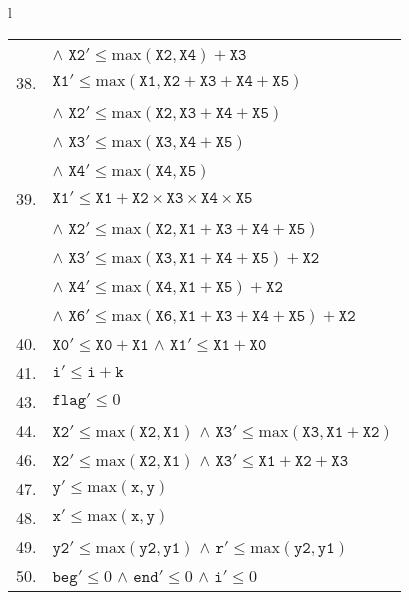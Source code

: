 \begin{table}[p]
{\begin{tabular}{l}
\begin{tabular}{p{.6cm}l}
     & $\land$ $\texttt{X2}' \leq \text{max}(\texttt{X2},\texttt{X4})+\texttt{X3}$ \\
 38. & $\texttt{X1}' \leq \text{max}(\texttt{X1},\texttt{X2}+\texttt{X3}+\texttt{X4}+\texttt{X5})$ \\
     & $\land$ $\texttt{X2}' \leq \text{max}(\texttt{X2},\texttt{X3}+\texttt{X4}+\texttt{X5})$ \\
     & $\land$ $\texttt{X3}' \leq \text{max}(\texttt{X3},\texttt{X4}+\texttt{X5})$ \\
     & $\land$ $\texttt{X4}' \leq \text{max}(\texttt{X4},\texttt{X5})$ \\
 39. & $\texttt{X1}' \leq \texttt{X1}+\texttt{X2}\times\texttt{X3}\times\texttt{X4}\times\texttt{X5}$ \\
     & $\land$ $\texttt{X2}' \leq \text{max}(\texttt{X2},\texttt{X1}+\texttt{X3}+\texttt{X4}+\texttt{X5})$ \\
     & $\land$ $\texttt{X3}' \leq \text{max}(\texttt{X3},\texttt{X1}+\texttt{X4}+\texttt{X5})+\texttt{X2}$ \\
     & $\land$ $\texttt{X4}' \leq \text{max}(\texttt{X4},\texttt{X1}+\texttt{X5})+\texttt{X2}$ \\
     & $\land$ $\texttt{X6}' \leq \text{max}(\texttt{X6},\texttt{X1}+\texttt{X3}+\texttt{X4}+\texttt{X5})+\texttt{X2}$ \\
 40. & $\texttt{X0}' \leq \texttt{X0}+\texttt{X1}$ $\land$ $\texttt{X1}' \leq \texttt{X1}+\texttt{X0}$ \\
 41. & $\texttt{i}' \leq \texttt{i}+\texttt{k}$ \\
 43. & $\texttt{flag}' \leq 0$ \\
 44. & $\texttt{X2}' \leq \text{max}(\texttt{X2},\texttt{X1})$ $\land$ $\texttt{X3}' \leq \text{max}(\texttt{X3},\texttt{X1}+\texttt{X2})$ \\
 46. & $\texttt{X2}' \leq \text{max}(\texttt{X2},\texttt{X1})$ $\land$ $\texttt{X3}' \leq \texttt{X1}+\texttt{X2}+\texttt{X3}$ \\
 47. & $\texttt{y}' \leq \text{max}(\texttt{x},\texttt{y})$ \\
 48. & $\texttt{x}' \leq \text{max}(\texttt{x},\texttt{y})$ \\
 49. & $\texttt{y2}' \leq \text{max}(\texttt{y2},\texttt{y1})$ $\land$ $\texttt{r}' \leq \text{max}(\texttt{y2},\texttt{y1})$ \\
 50. & $\texttt{beg}' \leq 0$ $\land$ $\texttt{end}' \leq 0$ $\land$ $\texttt{i}' \leq 0$ \\
\end{tabular} \\
\bottomrule
\end{tabular}
}
\label{tab:bounds}
\end{table}



